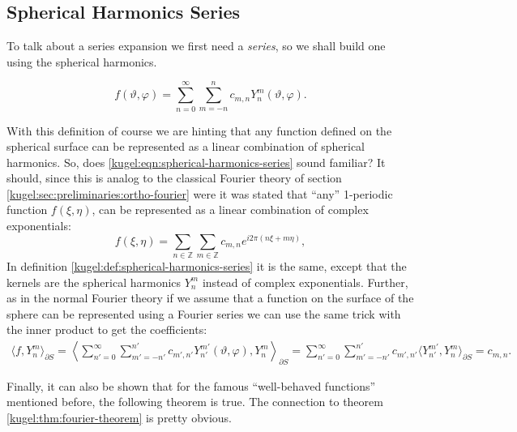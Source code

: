 \subsection{Spherical Harmonics Series}

To talk about a series expansion we first need a \emph{series}, so we shall
build one using the spherical harmonics.

\begin{definition}
  \label{kugel:def:spherical-harmonics-series}
  \begin{equation}
    \label{kugel:eqn:spherical-harmonics-series}
    f(\vartheta, \varphi) 
    = \sum_{n=0}^\infty \sum_{m =-n}^n
      c_{m,n} Y^m_n(\vartheta, \varphi).
  \end{equation}
\end{definition}

With this definition of course we are hinting that any function defined on the
spherical surface can be represented as a linear combination of spherical
harmonics. So, does \eqref{kugel:eqn:spherical-harmonics-series} sound familiar?
It should, since this is analog to the classical Fourier theory of section
\ref{kugel:sec:preliminaries:ortho-fourier} were it was stated that ``any''
1-periodic function $f(\xi, \eta)$, can be represented as a linear combination
of complex exponentials:
\begin{equation*}
  f(\xi, \eta) = \sum_{n \in \mathbb{Z}} \sum_{m \in \mathbb{Z}}
    c_{m,n} e^{i2\pi(n\xi + m\eta)},
\end{equation*}
In definition \ref{kugel:def:spherical-harmonics-series} it is the same, except
that the kernels are the spherical harmonics $Y^m_n$ instead of complex
exponentials. Further, as in the normal Fourier theory if we assume that a
function on the surface of the sphere can be represented using a Fourier series
we can use the same trick with the inner product to get the coefficients:
\begin{align*}
  \langle f, Y^{m}_{n} \rangle_{\partial S}
  = \left\langle \sum_{n'=0}^\infty \sum_{m' =-n'}^{n'}
    c_{m',n'} Y^{m'}_{n'}(\vartheta, \varphi), Y^{m}_{n} 
    \right\rangle_{\partial S}
  = \sum_{n'=0}^\infty \sum_{m' =-n'}^{n'} c_{m',n'}
    \langle Y^{m'}_{n'}, Y^{m}_{n} \rangle_{\partial S} = c_{m,n}.
\end{align*}

Finally, it can also be shown that for the famous ``well-behaved functions''
mentioned before, the following theorem is true. The connection to theorem
\ref{kugel:thm:fourier-theorem} is pretty obvious.

